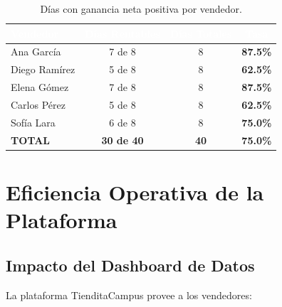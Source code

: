 \documentclass[12pt,letterpaper]{article}
\begin{document}
\begin{table}[H]
\centering
{}
\begin{tabular}{l c c c}
\toprule
\rowcolor{tabheader}
\textcolor{white}{\textbf{Vendedor}} &
\textcolor{white}{\textbf{Días Rentables}} &
\textcolor{white}{\textbf{Días Totales}} &
\textcolor{white}{\textbf{Tasa}} \\
\midrule
Ana García      & 7 de 8 & 8 & \textcolor{success}{\textbf{87.5\%}} \\
Diego Ramírez   & 5 de 8 & 8 & \textcolor{warning}{\textbf{62.5\%}} \\
Elena Gómez     & 7 de 8 & 8 & \textcolor{success}{\textbf{87.5\%}} \\
Carlos Pérez    & 5 de 8 & 8 & \textcolor{warning}{\textbf{62.5\%}} \\
Sofía Lara      & 6 de 8 & 8 & \textcolor{success}{\textbf{75.0\%}} \\
\midrule
\textbf{TOTAL}  & \textbf{30 de 40} & \textbf{40} & \textbf{75.0\%} \\
\bottomrule
\end{tabular}
\caption{Días con ganancia neta positiva por vendedor.}
\end{table}

\newpage
\section{Eficiencia Operativa de la Plataforma}

\subsection{Impacto del Dashboard de Datos}

La plataforma TienditaCampus provee a los vendedores:
\end{document}

